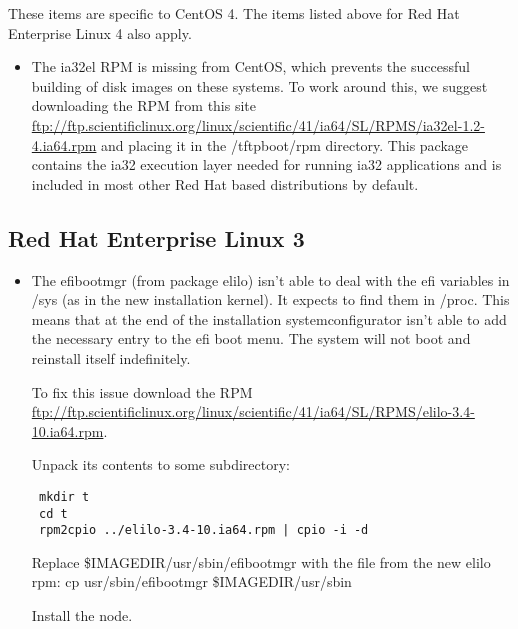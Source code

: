 These items are specific to CentOS 4.  The items listed above for Red Hat
Enterprise Linux 4 also apply.

\begin{itemize}

\item The ia32el RPM is missing from CentOS, which prevents the successful
building of disk images on these systems.  To work around this, we suggest
downloading the RPM from this site \url{ftp://ftp.scientificlinux.org/linux/scientific/41/ia64/SL/RPMS/ia32el-1.2-4.ia64.rpm}
and placing it in the /tftpboot/rpm directory.  This package contains the
ia32 execution layer needed for running ia32 applications and is included
in most other Red Hat based distributions by default.
\end{itemize}


\subsection{Red Hat Enterprise Linux 3}
\label{subsec:rhel3notes}

\begin{itemize}

\item The efibootmgr (from package elilo) isn't able to deal with the 
efi variables in /sys (as in the new installation kernel). It expects 
to find them in /proc. This means that at the end of the installation 
systemconfigurator isn't able to add the necessary entry to the efi 
boot menu. The system will not boot and reinstall itself indefinitely.

To fix this issue download the RPM \url{ftp://ftp.scientificlinux.org/linux/scientific/41/ia64/SL/RPMS/elilo-3.4-10.ia64.rpm}.

Unpack its contents to some subdirectory:
\begin{verbatim}
 mkdir t
 cd t
 rpm2cpio ../elilo-3.4-10.ia64.rpm | cpio -i -d
\end{verbatim}
Replace \$IMAGEDIR/usr/sbin/efibootmgr with the file from the new elilo rpm:
 cp usr/sbin/efibootmgr \$IMAGEDIR/usr/sbin

Install the node.

\end{itemize}

